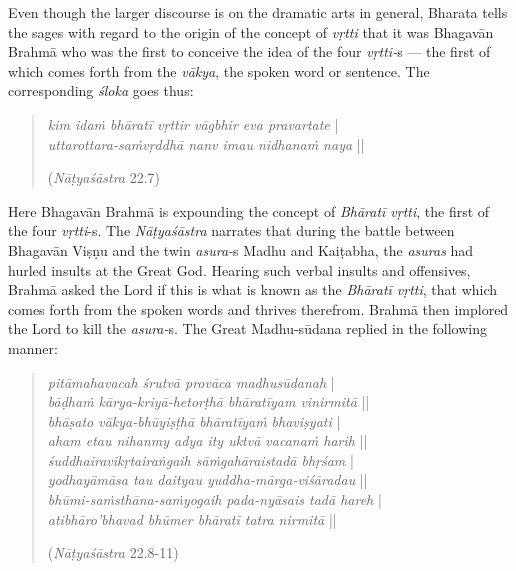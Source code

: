 Even though the larger discourse is on the dramatic arts in general, Bharata tells the sages with regard to the origin of the concept of \textsl{vṛtti} that it was Bhagavān Brahmā who was the first to conceive the idea of the four \textsl{vṛtti-}s --- the first of which comes forth from the \textsl{vākya}, the spoken word or sentence. The corresponding \textsl{śloka} goes thus:
\begin{quote}
\textsl{kim idaṁ bhāratī vṛttir vāgbhir eva pravartate} |  \\
\textsl{uttarottara-saṁvṛddhā nanv imau nidhanaṁ naya} || 

\hfill(\textsl{Nāṭyaśāstra} 22.7)
\end{quote}

Here Bhagavān Brahmā is expounding the concept of \textsl{Bhāratī vṛtti}, the first of the four \textsl{vṛtti}-s. The \textsl{Nāṭyaśāstra} narrates that during the battle between Bhagavān Viṣṇu and the twin \textsl{asura-}s Madhu and Kaiṭabha, the \textsl{asuras} had hurled insults at the Great God. Hearing such verbal insults and offensives, Brahmā asked the Lord if this is what is known as the \textsl{Bhāratī vṛtti}, that which comes forth from the spoken words and thrives therefrom. Brahmā then implored the Lord to kill the \textsl{asura-}s. The Great Madhu-sūdana replied in the following manner:
\begin{quote}
\textsl{pitāmahavacah śrutvā provāca madhusūdanah} |\\
\textsl{bāḍhaṁ kārya-kriyā-hetorṭhā bhāratīyam vinirmitā} ||\\
\textsl{bhāṣato vākya-bhūyiṣṭhā bhāratīyaṁ bhaviṣyati} |\\
\textsl{aham etau nihanmy adya ity uktvā vacanaṁ harih} ||\\
\textsl{śuddhairavikṛtairaṅgaih sāṁgahāraistadā bhṛśam} |\\
\textsl{yodhayāmāsa tau daityau yuddha-mārga-viśāradau} ||\\
\textsl{bhūmi-saṁsthāna-saṁyogaih pada-nyāsais tadā hareh} |\\
\textsl{atibhāro’bhavad bhūmer bhāratī tatra nirmitā} ||

\hfill (\textsl{Nāṭyaśāstra} 22.8-11)
\end{quote}


